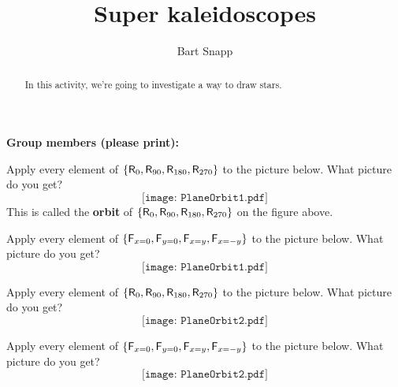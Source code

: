 \documentclass[handout,nooutcomes,noauthor]{ximera}
\title{Super kaleidoscopes}
\author{Bart Snapp}
\begin{document}
\begin{abstract}
  In this activity, we're going to investigate a way to draw stars.
\end{abstract}
\maketitle

\noindent\textbf{Group members (please print):}\ \hrulefill \\

\hrulefill


\begin{problem}
Apply every element of
$\{\mathsf{R}_{0},\mathsf{R}_{90},\mathsf{R}_{180},\mathsf{R}_{270}\}$ to the
picture below. What picture do you get?
\[
\texttt{[image: PlaneOrbit1.pdf]}
\]
This is called the \textbf{orbit} of
$\{\mathsf{R}_{0},\mathsf{R}_{90},\mathsf{R}_{180},\mathsf{R}_{270}\}$ on the
figure above.
\end{problem}

\vfill

\break

\begin{problem}
Apply every element of $\{\mathsf{F}_{x=0}, \mathsf{F}_{y=0}, \mathsf{F}_{x=y},\mathsf{F}_{x=-y}\}$ to the picture below. What picture do
you get?
\[
\texttt{[image: PlaneOrbit1.pdf]}
\]
\end{problem}

\vfill

\break

\begin{problem}
Apply every element of $\{\mathsf{R}_{0},\mathsf{R}_{90},\mathsf{R}_{180},\mathsf{R}_{270}\}$ to the picture below. What picture do
you get?
\[
\texttt{[image: PlaneOrbit2.pdf]}
\]
\end{problem}

\vfill

\break

\begin{problem}
Apply every element of
$\{\mathsf{F}_{x=0}, \mathsf{F}_{y=0}, \mathsf{F}_{x=y},\mathsf{F}_{x=-y}\}$ to
the picture below. What picture do you get?
\[
\texttt{[image: PlaneOrbit2.pdf]}
\]
\end{problem}

\vfill
\end{document}
